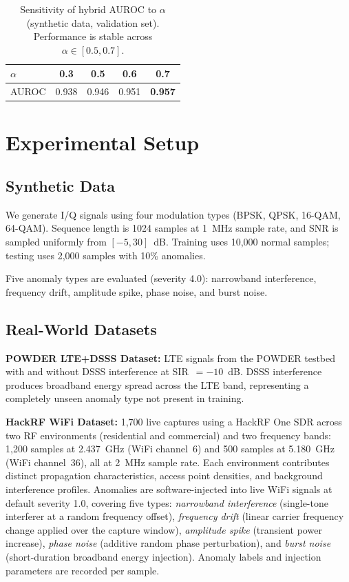 \documentclass[conference]{IEEEtran}
\begin{document}
\begin{table}[t]
\caption{Sensitivity of hybrid AUROC to $\alpha$ (synthetic data, validation set). Performance is stable across $\alpha \in [0.5, 0.7]$.}
\label{tab:alpha}
\centering
\begin{tabular}{@{}lcccc@{}}
\toprule
$\alpha$ & 0.3 & 0.5 & 0.6 & 0.7 \\
\midrule
AUROC & 0.938 & 0.946 & 0.951 & \textbf{0.957} \\
\bottomrule
\end{tabular}
\end{table}

\section{Experimental Setup}
\subsection{Synthetic Data}
We generate I/Q signals using four modulation types (BPSK, QPSK, 16-QAM, 64-QAM). Sequence length is 1024 samples at 1~MHz sample rate, and SNR is sampled uniformly from $[-5,30]$~dB. Training uses 10{,}000 normal samples; testing uses 2{,}000 samples with 10\% anomalies.

Five anomaly types are evaluated (severity 4.0): narrowband interference, frequency drift, amplitude spike, phase noise, and burst noise.

\subsection{Real-World Datasets}
\textbf{POWDER LTE+DSSS Dataset:} LTE signals from the POWDER testbed~\cite{breen2021} with and without DSSS interference at SIR~$=-10$~dB. DSSS interference produces broadband energy spread across the LTE band, representing a completely unseen anomaly type not present in training.

\textbf{HackRF WiFi Dataset:} 1{,}700 live captures using a HackRF One SDR across two RF environments (residential and commercial) and two frequency bands: 1{,}200 samples at 2.437~GHz (WiFi channel~6) and 500 samples at 5.180~GHz (WiFi channel~36), all at 2~MHz sample rate. Each environment contributes distinct propagation characteristics, access point densities, and background interference profiles. Anomalies are software-injected into live WiFi signals at default severity 1.0, covering five types: \emph{narrowband interference} (single-tone interferer at a random frequency offset), \emph{frequency drift} (linear carrier frequency change applied over the capture window), \emph{amplitude spike} (transient power increase), \emph{phase noise} (additive random phase perturbation), and \emph{burst noise} (short-duration broadband energy injection). Anomaly labels and injection parameters are recorded per sample.
\end{document}
